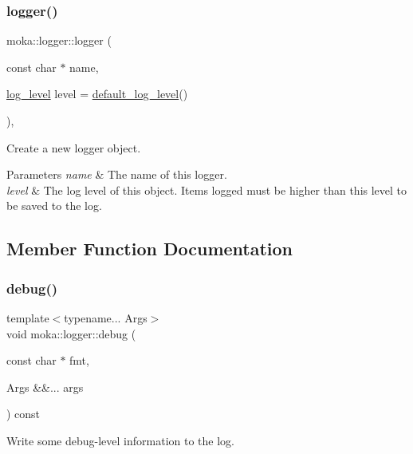 \subsubsection{\texorpdfstring{logger()}{logger()}}
{\footnotesize\ttfamily moka\+::logger\+::logger (\begin{DoxyParamCaption}\item[{const char $\ast$}]{name,  }\item[{\mbox{\hyperlink{namespacemoka_a7c4111664aee7737c54ab37376b2637d}{log\+\_\+level}}}]{level = {\ttfamily \mbox{\hyperlink{namespacemoka_ac3f7b72250cd352011df4f431c862df5}{default\+\_\+log\+\_\+level}}()} }\end{DoxyParamCaption})\hspace{0.3cm}{\ttfamily [inline]}, {\ttfamily [explicit]}}



Create a new logger object. 


\begin{DoxyParams}{Parameters}
{\em name} & The name of this logger. \\
\hline
{\em level} & The log level of this object. Items logged must be higher than this level to be saved to the log. \\
\hline
\end{DoxyParams}


\subsection{Member Function Documentation}
\mbox{\label{classmoka_1_1logger_ac8902f1eb4c4d77aad419dd765ccbac6}} 
\subsubsection{\texorpdfstring{debug()}{debug()}}
{\footnotesize\ttfamily template$<$typename... Args$>$ \\
void moka\+::logger\+::debug (\begin{DoxyParamCaption}\item[{const char $\ast$}]{fmt,  }\item[{Args \&\&...}]{args }\end{DoxyParamCaption}) const}



Write some debug-\/level information to the log. 


